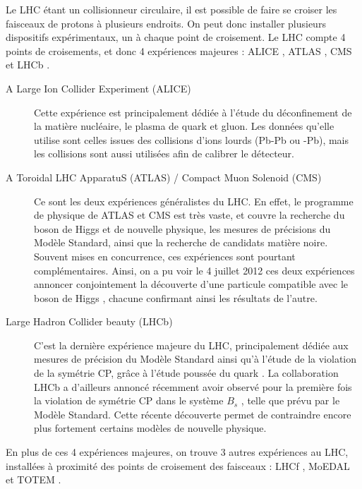 Le LHC étant un collisionneur circulaire, il est possible de faire se croiser les faisceaux de protons à plusieurs endroits. On peut donc installer plusieurs dispositifs expérimentaux, un à chaque point de croisement. Le LHC compte 4 points de croisements, et donc 4 expériences majeures : ALICE \citep{alice}, ATLAS \citep{atlas}, CMS \citep{cms} et LHCb \citep{lhcb}.

\begin{description}
  \item[A Large Ion Collider Experiment (ALICE)] Cette expérience est principalement dédiée à l'étude du déconfinement de la matière nucléaire, le plasma de quark et gluon. Les données qu'elle utilise sont celles issues des collisions d'ions lourds (Pb-Pb ou \Pproton{}-Pb), mais les collisions \Pproton{}\Pproton{} sont aussi utilisées afin de calibrer le détecteur.
  \item[A Toroidal LHC ApparatuS (ATLAS) / Compact Muon Solenoid (CMS)] Ce sont les deux expériences généralistes du LHC. En effet, le programme de physique de ATLAS et CMS est très vaste, et couvre la recherche du boson de Higgs et de nouvelle physique, les mesures de précisions du Modèle Standard, ainsi que la recherche de candidats matière noire. Souvent mises en concurrence, ces expériences sont pourtant complémentaires. Ainsi, on a pu voir le 4 juillet 2012 ces deux expériences annoncer conjointement la découverte d'une particule compatible avec le boson de Higgs \citep{higgs_atlas,higgs_cms}, chacune confirmant ainsi les résultats de l'autre.
  \item[Large Hadron Collider beauty (LHCb)] C'est la dernière expérience majeure du LHC, principalement dédiée aux mesures de précision du Modèle Standard ainsi qu'à l'étude de la violation de la symétrie CP, grâce à l'étude poussée du quark \Pbottom. La collaboration LHCb a d'ailleurs annoncé récemment avoir observé pour la première fois la violation de symétrie CP dans le système $B_s$ \citep{lhcb_bs}, telle que prévu par le Modèle Standard. Cette récente découverte permet de contraindre encore plus fortement certains modèles de nouvelle physique.
\end{description}

En plus de ces 4 expériences majeures, on trouve 3 autres expériences au LHC, installées à proximité des points de croisement des faisceaux : LHCf \citep{lhcf}, MoEDAL \citep{moedal} et TOTEM \citep{totem}.

